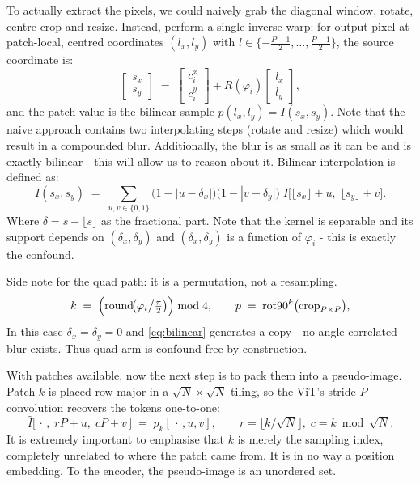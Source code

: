 \documentclass[final_report.tex]{subfiles}
\begin{document}
To actually extract the pixels, we could naively grab the diagonal window, rotate, centre-crop and resize. Instead, perform a single inverse warp: for output pixel at patch-local, centred coordinates $(l_x,l_y)$ with $l \in \{-\tfrac{P-1}{2}, \dots, \tfrac{P-1}{2}\}$, the source coordinate is:
\begin{equation}\label{eq:inverse-warp}
  \begin{bmatrix} s_x \\ s_y \end{bmatrix}
  \;=\;
  \begin{bmatrix} c^{x}_i \\ c^{y}_i \end{bmatrix}
  + R(\varphi_i)
  \begin{bmatrix} l_x \\ l_y \end{bmatrix},
\end{equation}
and the patch value is the bilinear sample $p(l_x, l_y) = I(s_x, s_y)$. Note that the naive approach contains two interpolating steps (rotate and resize) which would result in a compounded blur. Additionally, the blur is as small as it can be and is exactly bilinear - this will allow us to reason about it. Bilinear interpolation is defined as:
\begin{equation}\label{eq:bilinear}
  I(s_x, s_y) \;=\; \sum_{u,v \in \{0,1\}}
    \bigl(1 - |u - \delta_x|\bigr)\bigl(1 - |v - \delta_y|\bigr)\;
    I\bigl[\lfloor s_x \rfloor + u,\; \lfloor s_y \rfloor + v\bigr].
\end{equation}
Where $\delta = s - \lfloor s \rfloor$ as the fractional part. Note that the kernel is separable and its support depends on $(\delta_x,\delta_y)$ and $(\delta_x,\delta_y)$ is a function of $\varphi_i$ - this is exactly the confound.

Side note for the quad path: it is a permutation, not a resampling.
\begin{equation}\label{eq:quad-k}
  k \;=\; \Bigl(\operatorname{round}\!\bigl(\varphi_i \big/ \tfrac{\pi}{2}\bigr)\Bigr) \bmod 4,
  \qquad
  p \;=\; \operatorname{rot90}^{k}\bigl(\text{crop}_{P\times P}\bigr),
\end{equation}
In this case $\delta_x=\delta_y=0$ and \cref{eq:bilinear} generates a copy - no angle-correlated blur exists. Thus quad arm is confound-free by construction.

With patches available, now the next step is to pack them into a pseudo-image. Patch $k$ is placed row-major in a $\sqrt{N}\times\sqrt{N}$ tiling, so the ViT's stride-$P$ convolution recovers the tokens one-to-one:
\begin{equation}\label{eq:retile}
  \hat I\bigl[\,\cdot\,,\; r P + u,\; c P + v\,\bigr] \;=\; p_k[\,\cdot\,, u, v],
  \qquad r = \bigl\lfloor k / \sqrt{N} \bigr\rfloor,\; c = k \bmod \sqrt{N}.
\end{equation}
It is extremely important to emphasise that $k$ is merely the sampling index, completely unrelated to where the patch came from. It is in no way a position embedding. To the encoder, the pseudo-image is an unordered set.
\end{document}
